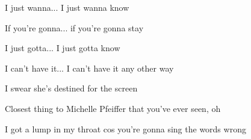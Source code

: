 \begin{song}
\bigskip

\Chorus \par

\bigskip

I just wanna... I just wanna know  \par
{} If you're gonna... if you're gonna stay  \par
{} I just gotta... I just gotta know  \par
{}I can't have it... I can't have it any other way \par
{} \par
I  swear she's destined for the screen \par
{}Closest thing to Michelle Pfeiffer that you've ever seen, oh \par

\bigskip


\Chorus {} \par

\bigskip

I got a lump in my throat cos you're gonna sing the words wrong \par

\end{song}
